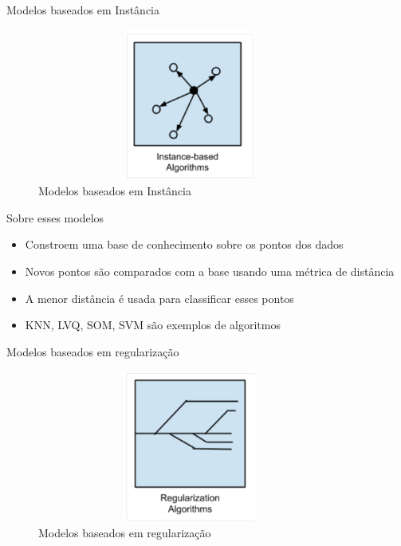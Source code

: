 \begin{frame}	
	\begin{block}{Modelos baseados em Instância}	
		\begin{figure}[!htb]
			\centering	  				
			\includegraphics[height=5cm, width = 10cm]{./pic/instance.png}
			\caption{Modelos baseados em Instância}
			\label{fig_modelos}
		\end{figure}
	\end{block}
\end{frame}


\begin{frame}	
	\begin{block}{Sobre esses modelos}	
		\begin{itemize}
			\item Constroem uma base de conhecimento sobre os pontos dos dados
			\item Novos pontos são comparados com a base usando uma métrica de distância
			\item A menor distância é usada para classificar esses pontos
			\item KNN, LVQ, SOM, SVM são exemplos de algoritmos
		\end{itemize}
	\end{block}
\end{frame}


\begin{frame}	
	\begin{block}{Modelos baseados em regularização}	
		\begin{figure}[!htb]
			\centering	  				
			\includegraphics[height=5cm, width = 10cm]{./pic/penalizacao.png}
			\caption{Modelos baseados em regularização}
			\label{fig_modelos}
		\end{figure}
	\end{block}
\end{frame}


